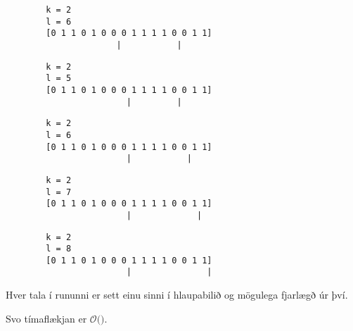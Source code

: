 { \begin{verbatim}
        k = 2
        l = 6
        [0 1 1 0 1 0 0 0 1 1 1 1 0 0 1 1]
                      |           |
\end{verbatim} }

{ \begin{verbatim}
        k = 2
        l = 5
        [0 1 1 0 1 0 0 0 1 1 1 1 0 0 1 1]
                        |         |
\end{verbatim} }

{ \begin{verbatim}
        k = 2
        l = 6
        [0 1 1 0 1 0 0 0 1 1 1 1 0 0 1 1]
                        |           |
\end{verbatim} }

{ \begin{verbatim}
        k = 2
        l = 7
        [0 1 1 0 1 0 0 0 1 1 1 1 0 0 1 1]
                        |             |
\end{verbatim} }

{ \begin{verbatim}
        k = 2
        l = 8
        [0 1 1 0 1 0 0 0 1 1 1 1 0 0 1 1]
                        |               |
\end{verbatim} }

{
	\only<all:1>{\hbilA}
	\only<all:2>{\hbilB}
	\only<all:3>{\hbilC}
	\only<all:4>{\hbilD}
	\only<all:5>{\hbilE}
	\only<all:6>{\hbilF}
	\only<all:7>{\hbilG}
	\only<all:8>{\hbilH}
	\only<all:9>{\hbilI}
	\only<all:10>{\hbilJ}
	\only<all:11>{\hbilK}
	\only<all:12>{\hbilL}
	\only<all:13>{\hbilM}
	\only<all:14>{\hbilN}
	\only<all:15>{\hbilO}
	\only<all:16>{\hbilP}
	\only<all:17>{\hbilQ}
	\only<all:18>{\hbilR}
	\only<all:19>{\hbilS}
	\only<all:20>{\hbilT}
	\only<all:21>{\hbilU}
	\only<all:22>{\hbilV}
	\only<all:23>{\hbilW}
	\only<all:24>{\hbilX}
	\only<all:25>{\hbilY}
}

{
}

{
	{
		\item<1-> Hver tala í rununni er sett einu sinni í hlaupabilið og mögulega fjarlægð úr því.
		\item<2-> Svo tímaflækjan er $\mathcal{O}($\onslide<3->{$\,n\,$}$)$.
	}
}


